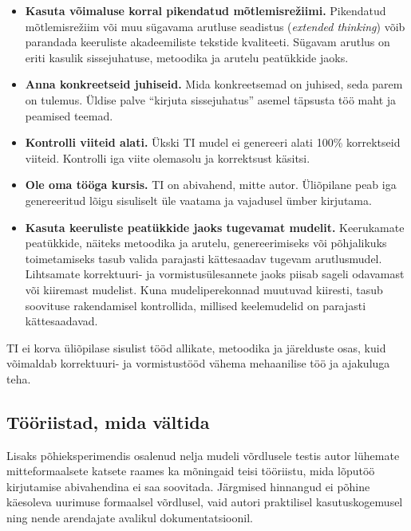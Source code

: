 \begin{itemize}
    \item \textbf{Kasuta võimaluse korral pikendatud mõtlemisrežiimi.} Pikendatud mõtlemisrežiim või muu sügavama arutluse seadistus (\textit{extended thinking}) võib parandada keeruliste akadeemiliste tekstide kvaliteeti. Sügavam arutlus on eriti kasulik sissejuhatuse, metoodika ja arutelu peatükkide jaoks.
    \item \textbf{Anna konkreetseid juhiseid.} Mida konkreetsemad on juhised, seda parem on tulemus. Üldise palve ``kirjuta sissejuhatus'' asemel täpsusta töö maht ja peamised teemad.
    \item \textbf{Kontrolli viiteid alati.} Ükski TI mudel ei genereeri alati 100\% korrektseid viiteid. Kontrolli iga viite olemasolu ja korrektsust käsitsi.
    \item \textbf{Ole oma tööga kursis.} TI on abivahend, mitte autor. Üliõpilane peab iga genereeritud lõigu sisuliselt üle vaatama ja vajadusel ümber kirjutama.
    \item \textbf{Kasuta keeruliste peatükkide jaoks tugevamat mudelit.} Keerukamate peatükkide, näiteks metoodika ja arutelu, genereerimiseks või põhjalikuks toimetamiseks tasub valida parajasti kättesaadav tugevam arutlusmudel. Lihtsamate korrektuuri- ja vormistusülesannete jaoks piisab sageli odavamast või kiiremast mudelist. Kuna mudeliperekonnad muutuvad kiiresti, tasub soovituse rakendamisel kontrollida, millised keelemudelid on parajasti kättesaadavad.
\end{itemize}

TI ei korva üliõpilase sisulist tööd allikate, metoodika ja järelduste osas, kuid võimaldab korrektuuri- ja vormistustööd vähema mehaanilise töö ja ajakuluga teha.

\subsection{Tööriistad, mida vältida} \label{subsec:valtida}

Lisaks põhieksperimendis osalenud nelja mudeli võrdlusele testis autor lühemate mitteformaalsete katsete raames ka mõningaid teisi tööriistu, mida lõputöö kirjutamise abivahendina ei saa soovitada. Järgmised hinnangud ei põhine käesoleva uurimuse formaalsel võrdlusel, vaid autori praktilisel kasutuskogemusel ning nende arendajate avalikul dokumentatsioonil.

